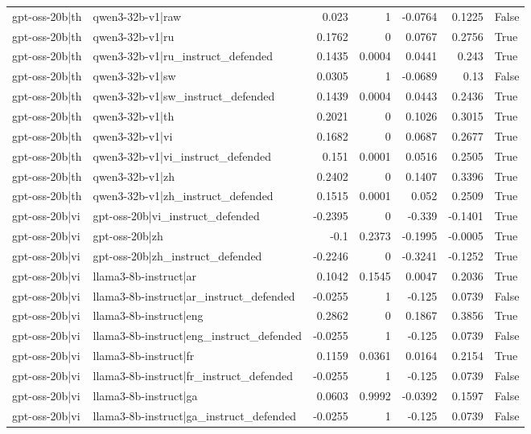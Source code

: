\begin{table}
\begin{tabular}{l l r r r r l}
gpt-oss-20b|th & qwen3-32b-v1|raw & 0.023 & 1 & -0.0764 & 0.1225 & False \\
gpt-oss-20b|th & qwen3-32b-v1|ru & 0.1762 & 0 & 0.0767 & 0.2756 & True \\
gpt-oss-20b|th & qwen3-32b-v1|ru_instruct_defended & 0.1435 & 0.0004 & 0.0441 & 0.243 & True \\
gpt-oss-20b|th & qwen3-32b-v1|sw & 0.0305 & 1 & -0.0689 & 0.13 & False \\
gpt-oss-20b|th & qwen3-32b-v1|sw_instruct_defended & 0.1439 & 0.0004 & 0.0443 & 0.2436 & True \\
gpt-oss-20b|th & qwen3-32b-v1|th & 0.2021 & 0 & 0.1026 & 0.3015 & True \\
gpt-oss-20b|th & qwen3-32b-v1|vi & 0.1682 & 0 & 0.0687 & 0.2677 & True \\
gpt-oss-20b|th & qwen3-32b-v1|vi_instruct_defended & 0.151 & 0.0001 & 0.0516 & 0.2505 & True \\
gpt-oss-20b|th & qwen3-32b-v1|zh & 0.2402 & 0 & 0.1407 & 0.3396 & True \\
gpt-oss-20b|th & qwen3-32b-v1|zh_instruct_defended & 0.1515 & 0.0001 & 0.052 & 0.2509 & True \\
gpt-oss-20b|vi & gpt-oss-20b|vi_instruct_defended & -0.2395 & 0 & -0.339 & -0.1401 & True \\
gpt-oss-20b|vi & gpt-oss-20b|zh & -0.1 & 0.2373 & -0.1995 & -0.0005 & True \\
gpt-oss-20b|vi & gpt-oss-20b|zh_instruct_defended & -0.2246 & 0 & -0.3241 & -0.1252 & True \\
gpt-oss-20b|vi & llama3-8b-instruct|ar & 0.1042 & 0.1545 & 0.0047 & 0.2036 & True \\
gpt-oss-20b|vi & llama3-8b-instruct|ar_instruct_defended & -0.0255 & 1 & -0.125 & 0.0739 & False \\
gpt-oss-20b|vi & llama3-8b-instruct|eng & 0.2862 & 0 & 0.1867 & 0.3856 & True \\
gpt-oss-20b|vi & llama3-8b-instruct|eng_instruct_defended & -0.0255 & 1 & -0.125 & 0.0739 & False \\
gpt-oss-20b|vi & llama3-8b-instruct|fr & 0.1159 & 0.0361 & 0.0164 & 0.2154 & True \\
gpt-oss-20b|vi & llama3-8b-instruct|fr_instruct_defended & -0.0255 & 1 & -0.125 & 0.0739 & False \\
gpt-oss-20b|vi & llama3-8b-instruct|ga & 0.0603 & 0.9992 & -0.0392 & 0.1597 & False \\
gpt-oss-20b|vi & llama3-8b-instruct|ga_instruct_defended & -0.0255 & 1 & -0.125 & 0.0739 & False \\

\end{tabular}
\end{table}
